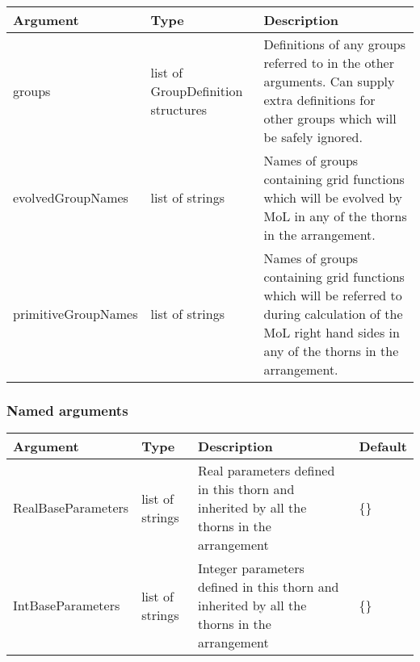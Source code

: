 \documentclass{report}
\newcommand{\tablewidth}{\textwidth}
\begin{document}
\begin{center}
\begin{tabularx}{\tablewidth}{|l|l|X|}
  \hline
  \bf Argument & \bf Type & \bf Description \\
  \hline
  groups              & list of GroupDefinition structures &

  Definitions of any groups referred to in the other arguments.  Can
  supply extra definitions for other groups which will be safely
  ignored.  \\

  evolvedGroupNames & list of strings &
  
  Names of groups containing grid functions which will be evolved by
  MoL in any of the thorns in the arrangement. \\

  primitiveGroupNames & list of strings &

  Names of groups containing grid functions which will be referred to
  during calculation of the MoL right hand sides in any of the thorns
  in the arrangement. \\

  \hline
\end{tabularx}
\end{center}

\subsubsection{Named arguments}

\begin{center}
\begin{tabularx}{\tablewidth}{|l|l|X|l|}
  \hline
  \bf Argument & \bf Type & \bf Description & \bf Default\\
  \hline
  RealBaseParameters & list of strings & Real parameters defined in this thorn 
and inherited by all the thorns in the arrangement & \{\}\\
  IntBaseParameters & list of strings & Integer parameters defined in this thorn 
and inherited by all the thorns in the arrangement& \{\}\\
  \hline
\end{tabularx}
\end{center}


\end{document}
